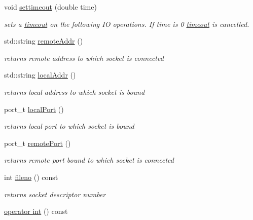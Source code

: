 \begin{CompactItemize}
void \hyperlink{classsocketpp_1_1BaseSocket_0804d148470fd742cda495d3533b25c6}{settimeout} (double time)
\begin{CompactList}\small\item\em sets a \hyperlink{classsocketpp_1_1timeout}{timeout} on the following IO operations. If time is 0 \hyperlink{classsocketpp_1_1timeout}{timeout} is cancelled. \item\end{CompactList}\item 
std::string \hyperlink{classsocketpp_1_1BaseSocket_483c6186ae60d0c399983e14f55af600}{remoteAddr} ()
\begin{CompactList}\small\item\em returns remote address to which socket is connected \item\end{CompactList}\item 
std::string \hyperlink{classsocketpp_1_1BaseSocket_0caed2e7d3f0e4db7d4c1aa3aba52caf}{localAddr} ()
\begin{CompactList}\small\item\em returns local address to which socket is bound \item\end{CompactList}\item 
port\_\-t \hyperlink{classsocketpp_1_1BaseSocket_d4a2c0e4932436ef61f911514385d16c}{localPort} ()
\begin{CompactList}\small\item\em returns local port to which socket is bound \item\end{CompactList}\item 
port\_\-t \hyperlink{classsocketpp_1_1BaseSocket_039db642444d2111f2f58ebe032c5f5f}{remotePort} ()
\begin{CompactList}\small\item\em returns remote port bound to which socket is connected \item\end{CompactList}\item 
int \hyperlink{classsocketpp_1_1BaseSocket_c96db07cc917926d895d89cf73734ea1}{fileno} () const 
\begin{CompactList}\small\item\em returns socket descriptor number \item\end{CompactList}\item 
\hypertarget{classsocketpp_1_1BaseSocket_fa397f810462fe61238dbbf2d9c42c90}{
\hyperlink{classsocketpp_1_1BaseSocket_fa397f810462fe61238dbbf2d9c42c90}{operator int} () const }
\label{classsocketpp_1_1BaseSocket_fa397f810462fe61238dbbf2d9c42c90}


\end{CompactItemize}
